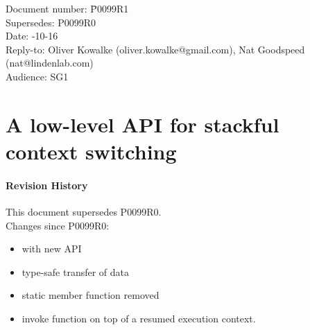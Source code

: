 \documentclass[paper=A4,pagesize,DIV=15]{scrartcl}
\begin{document}
\small
\begin{tabbing}
    Document number: \= P0099R1\\
    Supersedes:      \> P0099R0\\
    Date:            -10-16\\
    Reply-to:        \> Oliver Kowalke (oliver.kowalke@gmail.com), Nat Goodspeed (nat@lindenlab.com)\\
    Audience:        \> SG1\\
\end{tabbing}

\section*{A low-level API for stackful context switching}


\tableofcontents


\paragraph*{Revision History}
This document supersedes P0099R0.\\
\newline
Changes since P0099R0:

\begin{itemize}
    \item \ectx with new API
    \item type-safe transfer of data
    \item static member function  removed
    \item invoke function on top of a resumed execution context.
\end{itemize}

\newpage












\end{document}
